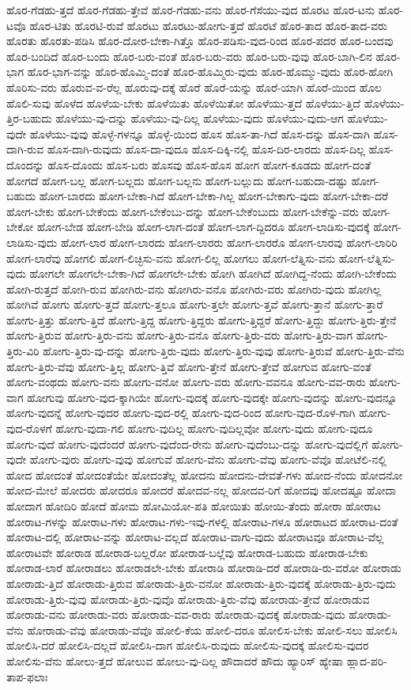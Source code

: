 {ಹೊರ-ಗೆಡಹು-ತ್ತದೆ
ಹೊರ-ಗೆಡಹು-ತ್ತೇವೆ
ಹೊರ-ಗೆಡಹು-ವನು
ಹೊರ-ಗೆಸೆಯು-ವುದ
ಹೊರಟ
ಹೊರ-ಟನು
ಹೊರ-ಟವೊ
ಹೊರ-ಟಿತು
ಹೊರಟಿ-ರುವೆ
ಹೊರಟು
ಹೊರಟು-ಹೋಗು-ತ್ತದೆ
ಹೊರಟೆ
ಹೊರ-ತಾದ
ಹೊರ-ತಾದ-ವರು
ಹೊರತು
ಹೊರತು-ಪಡಿಸಿ
ಹೊರ-ದೋರ-ಬೇಕಾ-ಗಿತ್ತೊ
ಹೊರ-ಪಡಿಸು-ವುದ-ರಿಂದ
ಹೊರ-ಪದರ
ಹೊರ-ಬಂದವು
ಹೊರ-ಬಂದಿದೆ
ಹೊರ-ಬಂದು
ಹೊರ-ಬರು-ವಂತೆ
ಹೊರ-ಬರು-ವರು
ಹೊರ-ಬರು-ವುವು
ಹೊರ-ಬಾಗಿ-ಲಿನ
ಹೊರ-ಭಾಗ
ಹೊರ-ಭಾಗ-ವನ್ನು
ಹೊರ-ಹೊಮ್ಮಿ-ದಂತೆ
ಹೊರ-ಹೊಮ್ಮಿರು-ವುದು
ಹೊರ-ಹೊಮ್ಮು-ವುದು
ಹೊರ-ಹೋಗಿ
ಹೊರಿಸು-ವರು
ಹೊರುವ-ವ-ರೆಲ್ಲ
ಹೊರುವು-ದಕ್ಕೆ
ಹೊರೆ
ಹೊರೆ-ಯನ್ನು
ಹೊರೆ-ಯಾಗಿ
ಹೊರೆ-ಯಿಂದ
ಹೊಲ
ಹೊಲಿ-ಸುವು
ಹೊಳೆದ
ಹೊಳೆಯ-ಬೇಕು
ಹೊಳೆಯಿತು
ಹೊಳೆಯಿತೋ
ಹೊಳೆಯು-ತ್ತದೆ
ಹೊಳೆಯು-ತ್ತಿದೆ
ಹೊಳೆಯು-ತ್ತಿರ-ಬಹುದು
ಹೊಳೆಯು-ವು-ದನ್ನು
ಹೊಳೆಯು-ವು-ದಿಲ್ಲ
ಹೊಳೆಯು-ವುದು
ಹೊಳೆಯು-ವುದು-ಆಗ
ಹೊಳೆಯು-ವುದೇ
ಹೊಳೆಯು-ವುವು
ಹೊಳ್ಳೆ-ಗಳನ್ನೂ
ಹೊಳ್ಳೆ-ಯಿಂದ
ಹೊಸ
ಹೊಸ-ತಾ-ಗಿದೆ
ಹೊಸ-ದನ್ನು
ಹೊಸ-ದಾಗಿ
ಹೊಸ-ದಾಗಿ-ರುವ
ಹೊಸ-ದಾಗಿ-ರುವುದು
ಹೊಸ-ದಾ-ವುದೂ
ಹೊಸ-ದಿಕ್ಕಿ-ನಲ್ಲಿ
ಹೊಸ-ದಿರ-ಲಾರದು
ಹೊಸ-ದಿಲ್ಲ
ಹೊಸ-ದೊಂದನ್ನು
ಹೊಸ-ದೊಂದು
ಹೊಸ-ಬರು
ಹೊಸವು
ಹೊಸ-ಹೊಸ
ಹೋಗ
ಹೋಗ-ಕೂಡದು
ಹೋಗ-ದಂತೆ
ಹೋಗದೆ
ಹೋಗ-ಬಲ್ಲ
ಹೋಗ-ಬಲ್ಲದು
ಹೋಗ-ಬಲ್ಲನು
ಹೋಗ-ಬಲ್ಲುದು
ಹೋಗ-ಬಹುದಾ-ದಷ್ಟು
ಹೋಗ-ಬಹುದು
ಹೋಗ-ಬಾರದು
ಹೋಗ-ಬೇಕಾ-ಗಿದೆ
ಹೋಗ-ಬೇಕಾ-ಗಿಲ್ಲ
ಹೋಗ-ಬೇಕಾಗು-ವುದು
ಹೋಗ-ಬೇಕಾ-ದರೆ
ಹೋಗ-ಬೇಕು
ಹೋಗ-ಬೇಕೆಂದು
ಹೋಗ-ಬೇಕೆಂಬು-ದನ್ನು
ಹೋಗ-ಬೇಕೆಂಬುದು
ಹೋಗ-ಬೇಕೆನ್ನು-ವರು
ಹೋಗ-ಬೇಕೋ
ಹೋಗ-ಬೇಡ
ಹೋಗ-ಬೇಡಿ
ಹೋಗ-ಲಾಗ-ದಂತೆ
ಹೋಗ-ಲಾಗ-ದ್ದಿದರೂ
ಹೋಗ-ಲಾಡಿಸು-ವುದಕ್ಕೆ
ಹೋಗ-ಲಾಡಿಸು-ವುದು
ಹೋಗ-ಲಾರ
ಹೋಗ-ಲಾರದು
ಹೋಗ-ಲಾರರು
ಹೋಗ-ಲಾರರೊ
ಹೋಗ-ಲಾರವು
ಹೋಗ-ಲಾರಿರಿ
ಹೋಗ-ಲಾರೆವು
ಹೋಗಲಿ
ಹೋಗ-ಲಿಚ್ಛಿಸು-ವನು
ಹೋಗ-ಲಿಲ್ಲ
ಹೋಗಲು
ಹೋಗ-ಲೆತ್ನಿಸು-ವನು
ಹೋಗ-ಲೆತ್ನಿಸು-ವುದು
ಹೋಗಲೇ
ಹೋಗಲೇ-ಬೇಕಾ-ಗಿದೆ
ಹೋಗಲೇ-ಬೇಕು
ಹೋಗಿ
ಹೋಗಿದೆ
ಹೋಗಿದ್ದ-ನೆಂದು
ಹೋಗಿ-ಬೇಕೆಂದು
ಹೋಗಿ-ರುತ್ತದೆ
ಹೋಗಿ-ರುವ
ಹೋಗಿರು-ವನು
ಹೋಗಿರು-ವನೊ
ಹೋಗಿರು-ವರು
ಹೋಗಿರು-ವುದು
ಹೋಗಿಲ್ಲ
ಹೋಗಿವೆ
ಹೋಗು
ಹೋಗು-ತ್ತದೆ
ಹೋಗು-ತ್ತಲೂ
ಹೋಗು-ತ್ತಲೇ
ಹೋಗು-ತ್ತವೆ
ಹೋಗು-ತ್ತಾನೆ
ಹೋಗು-ತ್ತಾರೆ
ಹೋಗು-ತ್ತಿತ್ತು
ಹೋಗು-ತ್ತಿದೆ
ಹೋಗು-ತ್ತಿದ್ದ
ಹೋಗು-ತ್ತಿದ್ದರು
ಹೋಗು-ತ್ತಿದ್ದರೆ
ಹೋಗು-ತ್ತಿದ್ದು
ಹೋಗು-ತ್ತಿರು-ತ್ತೇನೆ
ಹೋಗು-ತ್ತಿರುವ
ಹೋಗು-ತ್ತಿರು-ವನು
ಹೋಗು-ತ್ತಿರು-ವನೊ
ಹೋಗು-ತ್ತಿರು-ವರು
ಹೋಗು-ತ್ತಿರು-ವಾಗ
ಹೋಗು-ತ್ತಿರು-ವಿರಿ
ಹೋಗು-ತ್ತಿರು-ವು-ದನ್ನು
ಹೋಗು-ತ್ತಿರು-ವುದು
ಹೋಗು-ತ್ತಿರು-ವುವು
ಹೋಗು-ತ್ತಿರುವೆ
ಹೋಗು-ತ್ತಿರು-ವೆನು
ಹೋಗು-ತ್ತಿರು-ವೆವು
ಹೋಗು-ತ್ತಿಲ್ಲ
ಹೋಗು-ತ್ತಿವೆ
ಹೋಗು-ತ್ತೇನೆ
ಹೋಗು-ತ್ತೇವೆ
ಹೋಗುವ
ಹೋಗು-ವಂತೆ
ಹೋಗು-ವಂಥದು
ಹೋಗು-ವನು
ಹೋಗು-ವನೋ
ಹೋಗು-ವರು
ಹೋಗು-ವವನೂ
ಹೋಗು-ವವ-ರಾರು
ಹೋಗು-ವಾಗ
ಹೋಗುವು
ಹೋಗು-ವುದ-ಕ್ಕಾಗಿಯೇ
ಹೋಗು-ವುದಕ್ಕೆ
ಹೋಗು-ವುದಕ್ಕೇ
ಹೋಗು-ವುದನ್ನು
ಹೋಗು-ವುದನ್ನೂ
ಹೋಗು-ವುದನ್ನೆ
ಹೋಗು-ವುದರ
ಹೋಗು-ವುದ-ರಲ್ಲಿ
ಹೋಗು-ವುದ-ರಿಂದ
ಹೋಗು-ವುದ-ರೊಳ-ಗಾಗಿ
ಹೋಗು-ವುದ-ರೊಳಗೆ
ಹೋಗು-ವುದಾ-ಗಲಿ
ಹೋಗು-ವುದಿಲ್ಲ
ಹೋಗು-ವುದಿಲ್ಲವೋ
ಹೋಗು-ವುದು
ಹೋಗು-ವುದೂ
ಹೋಗು-ವುದೆ
ಹೋಗು-ವುದೆಂದರೆ
ಹೋಗು-ವುದೆಂದ-ರೇನು
ಹೋಗು-ವುದೆಂಬು-ದನ್ನು
ಹೋಗು-ವುದೆಲ್ಲಿಗೆ
ಹೋಗು-ವುದೇ
ಹೋಗು-ವುರು
ಹೋಗು-ವುವು
ಹೋಗುವೆ
ಹೋಗು-ವೆನು
ಹೋಗು-ವೆವು
ಹೋಗು-ವೆವೊ
ಹೋಟೆಲಿ-ನಲ್ಲಿ
ಹೋದ
ಹೋದಂತೆ
ಹೋದಂತೆಯೇ
ಹೋದಂತೆಲ್ಲ
ಹೋದನು
ಹೋದನು-ದೇವತೆ-ಗಳು
ಹೋದ-ನೆಂದು
ಹೋದನೋ
ಹೋದ-ಮೇಲೆ
ಹೋದರು
ಹೋದರೂ
ಹೋದರೆ
ಹೋದವ-ನಲ್ಲ
ಹೋದವ-ರಿಗೆ
ಹೋದವು
ಹೋದಷ್ಟೂ
ಹೋದಾ
ಹೋದಾಗ
ಹೋದಿರಿ
ಹೋದೆ
ಹೋಮ
ಹೋಮಿಯೋ-ಪತಿ
ಹೋಯಿತು
ಹೋಯಿ-ತೆಂದು
ಹೋರಾ
ಹೋರಾಟ
ಹೋರಾಟ-ಗಳನ್ನು
ಹೋರಾಟ-ಗಳು
ಹೋರಾಟ-ಗಳು-ಇವು-ಗಳಲ್ಲಿ
ಹೋರಾಟ-ಗಳೂ
ಹೋರಾಟದ
ಹೋರಾಟ-ದಂತೆ
ಹೋರಾಟ-ದಲ್ಲಿ
ಹೋರಾಟ-ವನ್ನು
ಹೋರಾಟ-ವಲ್ಲದೆ
ಹೋರಾಟ-ವಾಗು-ವುದು
ಹೋರಾಟವೂ
ಹೋರಾಟ-ವೆಲ್ಲ
ಹೋರಾಟವೇ
ಹೋರಾಡ
ಹೋರಾಡ-ಬಲ್ಲರೋ
ಹೋರಾಡ-ಬಲ್ಲೆವು
ಹೋರಾಡ-ಬಹುದು
ಹೋರಾಡ-ಬೇಕು
ಹೋರಾಡ-ಲಾರೆ
ಹೋರಾಡಲು
ಹೋರಾಡಲೇ-ಬೇಕು
ಹೋರಾಡಿ
ಹೋರಾಡಿ-ದರೆ
ಹೋರಾಡಿ-ರು-ವರೋ
ಹೋರಾಡು
ಹೋರಾಡು-ತ್ತಿದೆ
ಹೋರಾಡು-ತ್ತಿರುವ
ಹೋರಾಡು-ತ್ತಿರು-ವನೋ
ಹೋರಾಡು-ತ್ತಿರು-ವುದಕ್ಕೆ
ಹೋರಾಡು-ತ್ತಿರು-ವುದು
ಹೋರಾಡು-ತ್ತಿರು-ವುವು
ಹೋರಾಡು-ತ್ತಿರು-ವುವೊ
ಹೋರಾಡು-ತ್ತಿರು-ವೆವು
ಹೋರಾಡು-ತ್ತೇವೆ
ಹೋರಾಡುವ
ಹೋರಾಡು-ವನು
ಹೋರಾಡು-ವರು
ಹೋರಾಡು-ವವ-ರಾರು
ಹೋರಾಡು-ವುದಕ್ಕೆ
ಹೋರಾಡು-ವುದು
ಹೋರಾಡು-ವೆನು
ಹೋರಾಡು-ವೆವು
ಹೋರಾಡು-ವೆವೊ
ಹೋಲಿ-ಕೆಯ
ಹೋಲಿ-ದರೂ
ಹೋಲಿಸ-ಬೇಕು
ಹೋಲಿ-ಸಲು
ಹೋಲಿಸಿ
ಹೋಲಿಸಿ-ದರೆ
ಹೋಲಿಸಿ-ದಲ್ಲದೆ
ಹೋಲಿಸಿ-ದಾಗ
ಹೋಲಿಸಿ-ರುವುದು
ಹೋಲಿಸು-ವುದಕ್ಕೆ
ಹೋಲಿಸು-ವುದರ
ಹೋಲಿಸು-ವೆನು
ಹೋಲು-ತ್ತದೆ
ಹೋಲುವ
ಹೋಲು-ವು-ದಿಲ್ಲ
ಹೌದಾದರೆ
ಹೌದು
ಹ್ಯಾರಿಸ್
ಹ್ಯೇಷಾ
ಹ್ಲಾದ-ಪರಿ-ತಾಪ-ಫಲಾಃ
}
